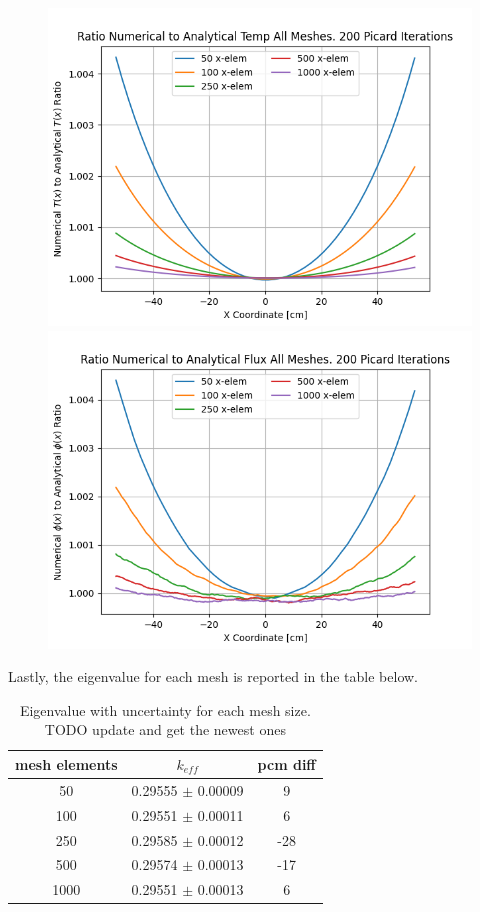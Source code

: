 \documentclass[letterpaper]{mc2023}
\begin{document}
\begin{figure}[H]
    \centering
    \begin{minipage}[b]{0.48\linewidth}
        \includegraphics[width=\linewidth]{figures/temp_num_to_analy_ratios.png}
    \end{minipage}
    \begin{minipage}[b]{0.48\linewidth}
        \includegraphics[width=\linewidth]{figures/flux_num_to_analy_ratios.png}
    \end{minipage}
\end{figure}
Lastly, the eigenvalue for each mesh is reported in the table below.
\begin{table}[H]
    \centering
    \caption{Eigenvalue with uncertainty for each mesh size. TODO update and get the newest ones}
    \begin{tabular}{c|c|c}
        \textbf{mesh elements} & $k_{eff}$ & pcm diff \\
        \hline
        50 & 0.29555 $\pm$ 0.00009 & 9 \\
        100 & 0.29551 $\pm$ 0.00011 & 6 \\
        250 & 0.29585  $\pm$ 0.00012 &  -28 \\
        500 & 0.29574 $\pm$ 0.00013 & -17 \\
        1000 & 0.29551 $\pm$ 0.00013 & 6
    \end{tabular}
    \label{tab:data}
\end{table}
\end{document}
